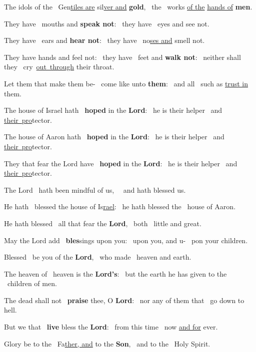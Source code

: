 \documentclass[12pt]{article} %
\newenvironment{psalmtext}{\leftskip 0.25in}{\vspace{2 mm}}
\def\pipe{\textcolor{benred8}{\textdoublepipe}}
\let\oldgresixstar\gresixstar
\renewcommand{\gresixstar}{\textcolor{benred8}{\oldgresixstar}}
\let\oldgredagger\gredagger
\renewcommand{\gredagger}{\textcolor{benred8}{\oldgredagger}}
\begin{document}
\begin{pages}
\begin{Rightside}
\begin{psalmtext}
The idols of the \pipe\ Gen\uline{tiles are} sil\uline{ver and} \textbf{gold}, \gresixstar\ the \pipe\ works \uline{of the} \uline{hands of} \textbf{men}.

They have \pipe\ mouths and \textbf{speak not}: \gresixstar\ they have \pipe\ eyes and see not.

They have \pipe\ ears and \textbf{hear not}: \gresixstar\ they have \pipe\ no\uline{ses and} smell not.

They have hands and feel not: \gredagger\ they have \pipe\ feet and \textbf{walk not}: \gresixstar\ neither shall they \pipe\ cry~\uline{out~through} their throat.

Let them that make them be- \pipe\ come like unto \textbf{them}: \gresixstar\ and all \pipe\ such as \uline{trust in} them.

The house of Israel hath \pipe\ \textbf{hoped} in the \textbf{Lord}: \gresixstar\ he is their helper \pipe\ and \uline{their~pro}tector.

The house of Aaron hath \pipe\ \textbf{hoped} in the \textbf{Lord}: \gresixstar\ he is their helper \pipe\ and \uline{their~pro}tector.

They that fear the Lord have \pipe\ \textbf{hoped} in the \textbf{Lord}: \gresixstar\ he is their helper \pipe\ and \uline{their~pro}tector.

The Lord \pipe\ hath been mindful of us, \gresixstar\ \pipe\ and hath blessed us.

He hath \pipe\ blessed the house of Is\uline{rael}: \gresixstar\ he hath blessed the \pipe\ house of Aaron.

He hath blessed \pipe\ all that fear the \textbf{Lord}, \gresixstar\ both \pipe\ little and great.

May the Lord add \pipe\ \textbf{bles}sings upon you: \gresixstar\ upon you, and u- \pipe\ pon your children.

Blessed \pipe\ be you of the \textbf{Lord}, \gresixstar\ who made \pipe\ heaven and earth.

The heaven of \pipe\ heaven is the \textbf{Lord's}: \gresixstar\ but the earth he has given to the \pipe\ children of men.

The dead shall not \pipe\ \textbf{praise} thee, O \textbf{Lord}: \gresixstar\ nor any of them that \pipe\ go down to hell.

But we that \pipe\ \textbf{live} bless the \textbf{Lord}: \gresixstar\ from this time \pipe\ now \uline{and for} ever.

Glory be to the \pipe\ Fa\uline{ther, and} to the \textbf{Son}, \gresixstar\ and to the \pipe\ Holy Spirit.


\end{psalmtext}
\end{Rightside}
\end{pages}
\end{document}
